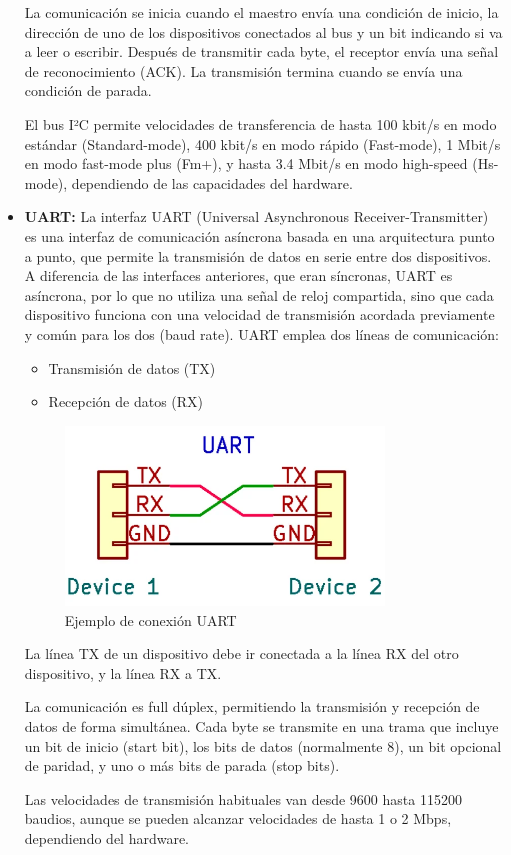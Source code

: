 \begin{itemize}
    La comunicación se inicia cuando el maestro envía una condición de inicio, la dirección de uno de los dispositivos conectados al bus y un bit indicando si va a leer o escribir.
    Después de transmitir cada byte, el receptor envía una señal de reconocimiento (ACK). La transmisión termina cuando se envía una condición de parada.

    El bus I²C permite velocidades de transferencia de hasta 100 kbit/s en modo estándar (Standard-mode), 400 kbit/s en modo rápido (Fast-mode), 1 Mbit/s en modo fast-mode plus (Fm+), y hasta 3.4 Mbit/s en modo high-speed (Hs-mode), dependiendo de las capacidades del hardware.

    \item \textbf{UART:} La interfaz UART (Universal Asynchronous Receiver-Transmitter)~\cite{infineon_uart} es una interfaz de comunicación asíncrona basada en una arquitectura punto a punto,
    que permite la transmisión de datos en serie entre dos dispositivos.
    A diferencia de las interfaces anteriores, que eran síncronas, UART es asíncrona, por lo que no utiliza una señal de reloj compartida,
    sino que cada dispositivo funciona con una velocidad de transmisión acordada previamente y común para los dos (baud rate).
    UART emplea dos líneas de comunicación:
    \begin{itemize}
        \item Transmisión de datos (TX)
        \item Recepción de datos (RX)
    \end{itemize}
    \begin{figure}[h]
        \centering
        \includegraphics[width=0.8\textwidth]{Imagenes/Bitmap/uart}
        \caption{Ejemplo de conexión UART}
        \label{fig:uart}
    \end{figure}
    La línea TX de un dispositivo debe ir conectada a la línea RX del otro dispositivo, y la línea RX a TX.

    La comunicación es full dúplex, permitiendo la transmisión y recepción de datos de forma simultánea.
    Cada byte se transmite en una trama que incluye un bit de inicio (start bit), los bits de datos (normalmente 8), un bit opcional de paridad, y uno o más bits de parada (stop bits).

    Las velocidades de transmisión habituales van desde 9600 hasta 115200 baudios, aunque se pueden alcanzar velocidades de hasta 1 o 2 Mbps, dependiendo del hardware.

\end{itemize}

